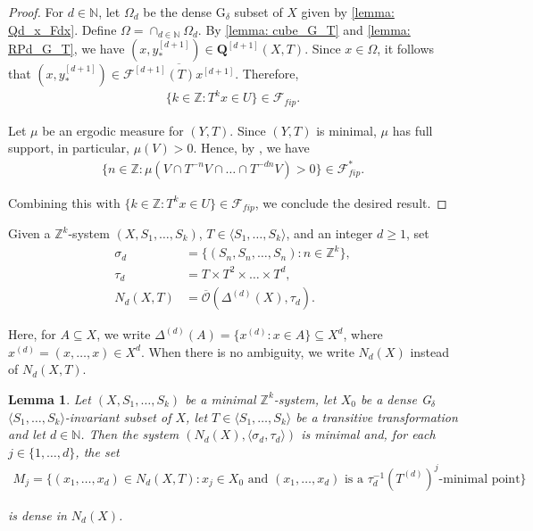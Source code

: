 \documentclass[11pt,reqno]{amsart}
\newcommand{\Z}{\mathbb{Z}}
\newcommand{\N}{\mathbb{N}}
\newcommand{\bQ}{\bm{Q}}
\newcommand{\cF}{{\mathcal F}}
\newcommand{\cO}{{\mathcal O}}
\newtheorem{lemma}[lemma]{Lemma}
\theoremstyle{definition}
\theoremstyle{remark}
\begin{document}
\begin{proof}
    For $d\in\mathbb{N}$, let $\Omega_d$ be the dense G$_\delta$ subset of $X$ given by \cref{lemma: Qd_x_Fdx}. Define $\Omega = \cap_{d\in\N}\Omega_{d}$. By \cref{lemma: cube_G_T} and \cref{lemma: RPd_G_T}, we have $(x,y^{[d+1]}_{*})\in \bQ^{[d+1]}(X,T)$. Since $x\in \Omega$, it follows that $(x,y^{[d+1]}_{*})\in \overline{\cF^{[d+1]}(T)x^{[d+1]}}$. Therefore,\begin{align*}
        \{k\in \Z: T^{k}x\in U\}\in \cF_{fip}.
    \end{align*}
    
    Let $\mu$ be an ergodic measure for $(Y,T)$. Since $(Y,T)$ is minimal, $\mu$ has full support, in particular, $\mu(V)>0$. Hence, by {\cite{Furstenberg_Katznelson85}}, we have\begin{align*}
        \{n\in\Z: \mu(V \cap T^{-n}V\cap \dots\cap T^{-dn} V)>0 \} \in \cF_{fip}^{*}.
    \end{align*}

    Combining this with $\{k\in \Z: T^{k}x\in U\}\in \cF_{fip}$, we conclude the desired result.
\end{proof}

Given a $\Z^{k}$-system $(X,S_1,\dots,S_k)$, $T\in \langle S_1,\dots,S_k\rangle$, and an integer $d\geq 1$, set \begin{align*}
    \sigma_{d} &= \{(S_n,S_n,\dots,S_n): n\in \Z^k\},\\
    \tau_{d} &=  T\times T^2\times \dots\times T^d,\\
    N_{d}(X,T) &= \overline{\cO}( \Delta^{(d)}(X),\tau_d).
\end{align*}

Here, for $A\subseteq X$, we write $\Delta^{(d)}(A)=\{x^{(d)}:x\in A\}\subseteq X^{d}$, where $x^{(d)} = (x,\dots,x)\in X^{d}$. When there is no ambiguity, we write $N_d(X)$ instead of $N_d(X,T)$.

\begin{lemma}
    Let $(X,S_1,\dots,S_k)$ be a minimal $\Z^k$-system, let $X_0$ be a dense G$_\delta$ $\langle S_1,\dots,S_k\rangle $-invariant subset of $X$, let $T\in \langle S_1,\dots,S_k \rangle$ be a transitive transformation and let $d\in \N$. Then the system $(N_d(X),\langle \sigma_{d},\tau_{d}\rangle)$ is minimal and, for each $j\in \{1,\dots,d\}$, the set\begin{align*}
        M_j=\{(x_1,\dots,x_d)\in N_{d}(X,T): x_j\in X_{0} \text{ and } (x_1,\dots,x_d)\text{ is a }\tau_{d}^{-1}(T^{(d)})^{j}\text{-minimal point}\}
    \end{align*}

    is dense in $N_{d}(X)$.
\end{lemma}
\end{document}
